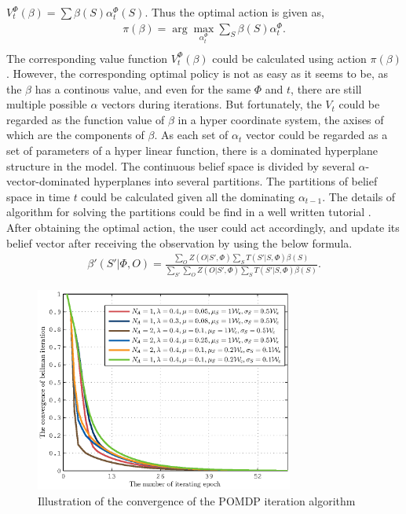 \documentclass[conference]{IEEEtran}
\begin{document}
\(V_t^\Phi\left(\beta\right) = \sum\beta\left(S\right)\alpha_t^\Phi\left(S\right)\).
Thus the optimal action is given as,
\begin{equation}
\begin{aligned}
	\pi\left(\beta\right) =
	\arg\underset{\alpha_t^\Phi}{\max}\sum\limits_{S}\beta\left(S\right)\alpha_t^\Phi.\\
\end{aligned}
\end{equation}
The corresponding value function \(V_t^\Phi\left(\beta\right)\) could be calculated using action \(\pi\left(\beta\right)\).
However, the corresponding optimal policy is not as easy as it seems to be, as the \(\beta\) has a continous value,
and even for the same \(\Phi\) and \(t\), there are still multiple possible \(\alpha\) vectors during iterations.
But fortunately, the \(V_t\) could be regarded as the function value of \(\beta\) in a hyper coordinate system,
the axises of which are the components of \(\beta\).
As each set of \(\alpha_t\) vector could be regarded as a set of parameters of a hyper linear function,
there is a dominated hyperplane structure in the model.
The continuous belief space is divided by several \(\alpha\)-vector-dominated hyperplanes into several partitions.
The partitions of belief space in time \(t\) could be calculated given all the dominating \(\alpha_{t-1}\).
The details of algorithm for solving the partitions could be find in a well written tutorial \cite{pomdptool}.\\
\indent
After obtaining the optimal action, the user could act accordingly, 
and update its belief vector after receiving the observation by using the below formula.
\begin{align}
	\beta'\left(S'|\Phi, O\right) = \frac{\sum_{O}Z\left(O|S',\Phi\right)\sum_{S}
	T\left(S'|S,\Phi\right)\beta\left(S\right)}
	{\sum_{S'}\sum_{O}Z\left(O|S',\Phi\right)\sum_{S}T\left(S'|S,\Phi\right)\beta\left(S\right)}.
\end{align}
\begin{figure}
\centering
\includegraphics[width=8.5cm]{2_fig3.eps}
\caption{Illustration of the convergence of the POMDP iteration algorithm}
\end{figure}
\end{document}
